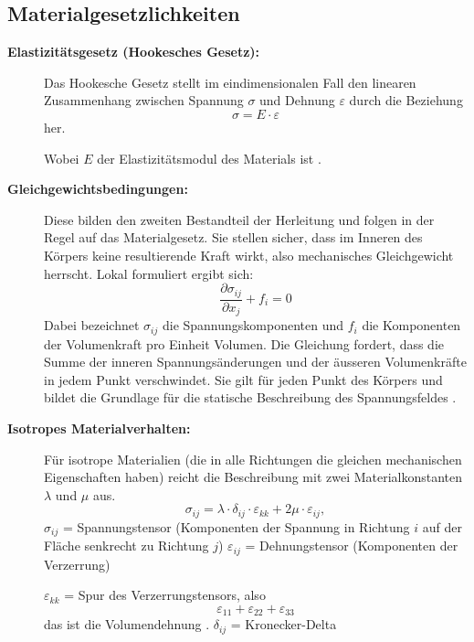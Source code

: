 \subsection{Materialgesetzlichkeiten}
\begin{description}	
	\item[\textbf{Elastizitätsgesetz (Hookesches Gesetz):}] Das Hookesche Gesetz stellt im eindimensionalen Fall den linearen Zusammenhang zwischen Spannung $\sigma$ und Dehnung $\varepsilon$ durch die Beziehung 
	\begin{equation}
		\sigma = 
		E \cdot \varepsilon
	\end{equation}
	 her.
	 
	 Wobei $E$ der Elastizitätsmodul des Materials ist \cite{elastomechanik:Kontinuumsmechanik}.
	 \item[\textbf{Gleichgewichtsbedingungen:}] Diese bilden den zweiten Bestandteil der Herleitung und folgen in der Regel auf das Materialgesetz. 
	 Sie stellen sicher, dass im Inneren des Körpers keine resultierende Kraft wirkt, also mechanisches Gleichgewicht herrscht.
	 Lokal formuliert ergibt sich:
	 \begin{equation}
	 	\frac{\partial \sigma_{ij}}{\partial x_j} + f_i =
	 	0
	 \end{equation}
	 Dabei bezeichnet $\sigma_{ij}$ die Spannungskomponenten und $f_i$ die Komponenten der Volumenkraft pro Einheit Volumen. 
	 Die Gleichung fordert, dass die Summe der inneren Spannungsänderungen und der äusseren Volumenkräfte in jedem Punkt verschwindet. Sie gilt für jeden Punkt des Körpers und bildet die Grundlage für die statische Beschreibung des Spannungsfeldes \cite{elastomechanik:Grundlagen_der_Elastizitaetstheorie}.
	 \item[\textbf{Isotropes Materialverhalten:}] Für isotrope Materialien (die in alle Richtungen die gleichen mechanischen Eigenschaften haben) reicht die Beschreibung mit zwei Materialkonstanten $\lambda$ und $\mu$ aus.
	 \begin{equation}
	 	\sigma_{ij} = 
	 	\lambda \cdot \delta_{ij} \cdot \varepsilon_{kk} + 2\mu \cdot \varepsilon_{ij},
	 \end{equation}
	$\sigma_{ij}$ = Spannungstensor (Komponenten der Spannung in Richtung $i$ auf der Fläche senkrecht zu Richtung $j$)
	$\varepsilon_{ij}$ = Dehnungstensor (Komponenten der Verzerrung)
	
	$\varepsilon_{kk}$ = Spur des Verzerrungstensors, also
	\begin{equation}
		\varepsilon_{11} + \varepsilon_{22} + \varepsilon_{33}
	\end{equation}
	das ist die Volumendehnung \cite{elastomechanik:Grundlagen_der_Elastizitaetstheorie}.
	 $\delta_{ij}$ = Kronecker-Delta 
	 

\end{description}
